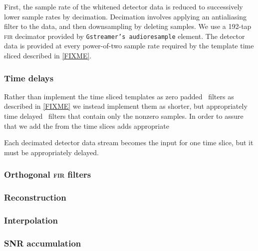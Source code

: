 First, the sample rate of the whitened detector data is reduced to successively
lower sample rates by decimation.  Decimation involves applying an antialiasing
filter to the data, and then downsampling by deleting samples.  We use a
192-tap \textsc{fir} decimator provided by {\tt Gstreamer's audioresample} element.
The detector data is provided at every power-of-two sample rate required by the 
template time sliced described in \ref{FIXME}. 

\subsubsection{Time delays}

Rather than implement the time sliced templates as zero padded \fir\ filters as
described in \eqref{FIXME} we instead implement them as shorter, but
appropriately time delayed \fir\ filters that contain only the nonzero samples.
In order to assure that we add the \SNR from the time slices adds appropriate


Each decimated detector data stream becomes the input for one time slice, but
it must be appropriately delayed.

\subsubsection{Orthogonal \textsc{fir} filters}

\subsubsection{Reconstruction}

\subsubsection{Interpolation}

\subsubsection{SNR accumulation}
